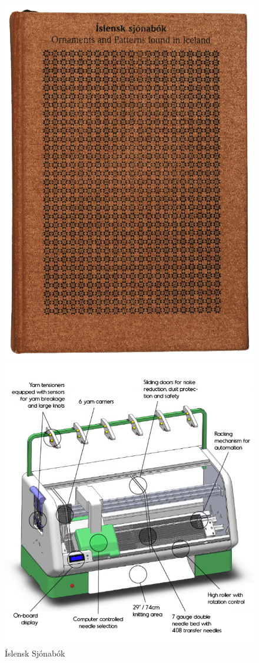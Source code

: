 \documentclass[a4paper,12pt,twoside]{article}
\begin{document}
\begin{figure}
    \centering
    \begin{minipage}[b]{0.45\linewidth}
        \centering
        \includegraphics[width=.8\linewidth]{myndir/sjónabók.png}
        \caption{Íslensk Sjónabók}
        \label{fig:sjonabok}
    \end{minipage}
    \hspace{0.05\linewidth} %
    \begin{minipage}[b]{0.45\linewidth}
        \centering
        \includegraphics[width=\linewidth]{myndir/skema-kniterate.png}

\end{minipage}
\end{figure}
\end{document}
